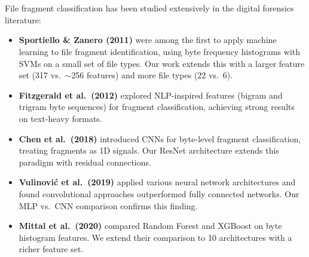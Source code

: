 \documentclass[12pt,a4paper]{report}
\begin{document}
\chapter{}
\begin{normalsize}
\noindent

{\setlength{\baselineskip}{1.0\baselineskip}
File fragment classification has been studied extensively in the digital forensics literature:

\begin{itemize}
    \item \textbf{Sportiello \& Zanero (2011)} \cite{sportiello2011} were among the first to apply machine learning to file fragment identification, using byte frequency histograms with SVMs on a small set of file types. Our work extends this with a larger feature set (317 vs.\ $\sim$256 features) and more file types (22 vs.\ 6).

    \item \textbf{Fitzgerald et al.\ (2012)} \cite{fitzgerald2012} explored NLP-inspired features (bigram and trigram byte sequences) for fragment classification, achieving strong results on text-heavy formats.

    \item \textbf{Chen et al.\ (2018)} \cite{chen2018} introduced CNNs for byte-level fragment classification, treating fragments as 1D signals. Our ResNet architecture extends this paradigm with residual connections.

    \item \textbf{Vulinovi\'{c} et al.\ (2019)} \cite{vulinovic2019} applied various neural network architectures and found convolutional approaches outperformed fully connected networks. Our MLP vs.\ CNN comparison confirms this finding.

    \item \textbf{Mittal et al.\ (2020)} \cite{mittal2020} compared Random Forest and XGBoost on byte histogram features. We extend their comparison to 10 architectures with a richer feature set.
\end{itemize}
\par}

\end{normalsize}

\newpage
\end{document}
